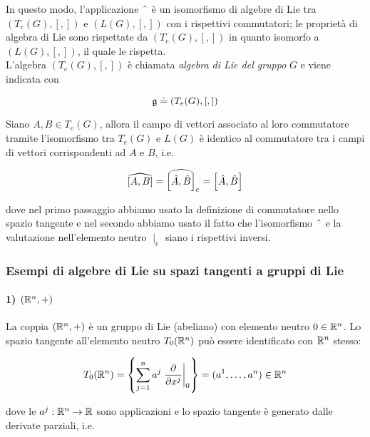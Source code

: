 In questo modo, l'applicazione $ \; \hat{} \; $ è un isomorfismo di algebre di Lie tra $ (T_{e}(G),[,]) $ e $ (L(G),[,]) $ con i rispettivi commutatori; le proprietà di algebra di Lie sono rispettate da $ (T_{e}(G),[,]) $ in quanto isomorfo a $ (L(G),[,]) $, il quale le rispetta.\\
L'algebra $ (T_{e}(G),[,]) $ è chiamata \textit{algebra di Lie del gruppo} $ G $ e viene indicata con

\begin{equation}
	\mathfrak{g} \doteq (T_{e}(G),[,])
\end{equation}

\begin{remark}
	Siano $ A,B \in T_{e}(G) $, allora il campo di vettori associato al loro commutatore tramite l'isomorfismo tra $ T_{e}(G) $ e $ L(G) $ è identico al commutatore tra i campi di vettori corrispondenti ad $ A $ e $ B $, i.e.
	
	\begin{equation}
		\widehat{[A,B]} = \widehat{\comm{\hat{A}}{\hat{B}}}_{e} = \comm{\hat{A}}{\hat{B}}
	\end{equation}

	dove nel primo passaggio abbiamo usato la definizione di commutatore nello spazio tangente e nel secondo abbiamo usato il fatto che l'isomorfismo $ \; \hat{} \; $ e la valutazione nell'elemento neutro $ \mid_{e} $ siano i rispettivi inversi.
\end{remark}

\subsubsection{Esempi di algebre di Lie su spazi tangenti a gruppi di Lie}

\paragraph{1) $ (\mathbb{R}^{n},+) $}

La coppia $ (\mathbb{R}^{n},+) $ è un gruppo di Lie (abeliano) con elemento neutro $ 0 \in \mathbb{R}^{n} $. Lo spazio tangente all'elemento neutro $ T_{0}(\mathbb{R}^{n}) $ può essere identificato con $ \mathbb{R}^{n} $ stesso:

\begin{equation}
	T_{0}(\R^{n}) = \left\{ \sum_{j=1}^{n} a^{j} \eval{\pdv{x^{j}}}_{0} \right\} %
	= (a^{1},\dots,a^{n}) \in \R^{n}
\end{equation}

dove le $ a^{j} : \mathbb{R}^{n} \to \mathbb{R} $ sono applicazioni e lo spazio tangente è generato dalle derivate parziali, i.e.

